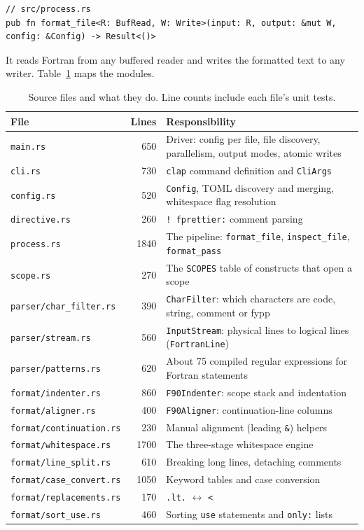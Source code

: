 \documentclass[11pt,a4paper,openany]{book}
\newcommand{\code}[1]{\texttt{\small #1}}
\newcommand{\file}[1]{\texttt{\small\color{accent}#1}}
\begin{document}
\begin{lstlisting}[style=rust]
// src/process.rs
pub fn format_file<R: BufRead, W: Write>(input: R, output: &mut W, config: &Config) -> Result<()>
\end{lstlisting}

It reads Fortran from any buffered reader and writes the formatted text to any
writer. Table~\ref{tab:modules} maps the modules.

\begin{table}[ht]
\centering\small
\begin{tabularx}{\linewidth}{@{}l r X@{}}
\toprule
File & Lines & Responsibility\\
\midrule
\file{main.rs} & 650 & Driver: config per file, file discovery, parallelism, output modes, atomic writes\\
\file{cli.rs} & 730 & \code{clap} command definition and \code{CliArgs}\\
\file{config.rs} & 520 & \code{Config}, TOML discovery and merging, whitespace flag resolution\\
\file{directive.rs} & 260 & \code{! fprettier:} comment parsing\\
\file{process.rs} & 1840 & The pipeline: \code{format\_file}, \code{inspect\_file}, \code{format\_pass}\\
\file{scope.rs} & 270 & The \code{SCOPES} table of constructs that open a scope\\
\midrule
\file{parser/char\_filter.rs} & 390 & \code{CharFilter}: which characters are code, string, comment or fypp\\
\file{parser/stream.rs} & 560 & \code{InputStream}: physical lines to logical lines (\code{FortranLine})\\
\file{parser/patterns.rs} & 620 & About 75 compiled regular expressions for Fortran statements\\
\midrule
\file{format/indenter.rs} & 860 & \code{F90Indenter}: scope stack and indentation\\
\file{format/aligner.rs} & 400 & \code{F90Aligner}: continuation-line columns\\
\file{format/continuation.rs} & 230 & Manual alignment (leading \code{\&}) helpers\\
\file{format/whitespace.rs} & 1700 & The three-stage whitespace engine\\
\file{format/line\_split.rs} & 610 & Breaking long lines, detaching comments\\
\file{format/case\_convert.rs} & 1050 & Keyword tables and case conversion\\
\file{format/replacements.rs} & 170 & \code{.lt.} $\leftrightarrow$ \code{<}\\
\file{format/sort\_use.rs} & 460 & Sorting \code{use} statements and \code{only:} lists\\
\bottomrule
\end{tabularx}
\caption{Source files and what they do. Line counts include each file's unit
tests.}
\label{tab:modules}
\end{table}
\end{document}
